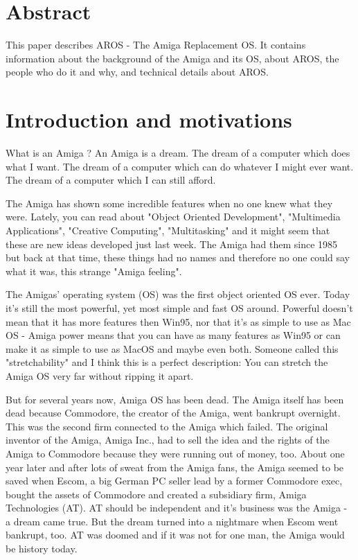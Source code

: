 \setlength{\parskip}{10pt}
\addtolength{\textheight}{2cm}
\addtolength{\textwidth}{2cm}
\addtolength{\hoffset}{-1cm}
\addtolength{\voffset}{-1cm}



\part{Abstract}

This paper describes AROS - The Amiga Replacement OS. It contains
information about the background of the Amiga and its OS, about AROS, the
people who do it and why, and technical details about AROS.

\part{Introduction and motivations}

What is an Amiga ? An Amiga is a dream. The dream of a computer which
does what I want. The dream of a computer which can do whatever I might
ever want. The dream of a computer which I can still afford.

The Amiga has shown some incredible features when no one knew what they
were. Lately, you can read about "Object Oriented Development", "Multimedia
Applications", "Creative Computing", "Multitasking" and it might seem that
these are new ideas developed just last week. The Amiga had them since 1985
but back at that time, these things had no names and therefore no one could
say what it was, this strange "Amiga feeling".

The Amigas' operating system (OS) was the first object oriented OS ever.
Today it's still the most powerful, yet most simple and fast OS around.
Powerful doesn't mean that it has more features then Win95, nor that it's
as simple to use as Mac OS - Amiga power means that you can have as many
features as Win95 or can make it as simple to use as MacOS and maybe even
both. Someone called this "stretchability" and I think this is a perfect
description: You can stretch the Amiga OS very far without ripping it apart.

But for several years now, Amiga OS has been dead. The Amiga itself has been
dead because Commodore, the creator of the Amiga, went bankrupt overnight.
This was the second firm connected to the Amiga which failed. The
original inventor of the Amiga, Amiga Inc., had to sell the idea and the
rights of the Amiga to Commodore because they were running out of money,
too. About one year later and after lots of sweat from the Amiga fans,
the Amiga seemed to be saved when Escom, a big German PC seller lead by
a former Commodore exec, bought the assets of Commodore and created
a subsidiary firm, Amiga Technologies (AT). AT should be
independent and it's business was the Amiga - a dream came true. But
the dream turned into a nightmare when Escom went bankrupt, too.
AT was doomed and if it was not for one man, the
Amiga would be history today.


